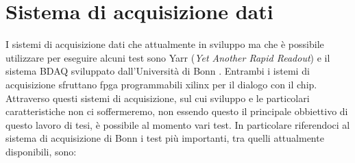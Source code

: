 \section{Sistema di acquisizione dati}
I sistemi di acquisizione dati che attualmente in sviluppo ma che è possibile utilizzare per eseguire alcuni test sono Yarr (\textit{Yet Another Rapid Readout}) \cite{YARR} e il sistema BDAQ sviluppato dall'Università di Bonn \cite{BDAQ}. 
Entrambi i istemi di acquisizione sfruttano fpga programmabili xilinx per il dialogo con il chip. 
Attraverso questi sistemi di acquisizione, sul cui sviluppo e le particolari caratteristiche non ci soffermeremo, non essendo questo il principale obbiettivo di questo lavoro di tesi, è possibile al momento vari test. 
In particolare riferendoci al sistema di acquisizione di Bonn i test più importanti, tra quelli attualmente disponibili, sono:

